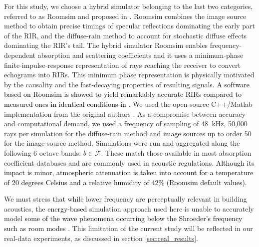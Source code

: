 \documentclass[reprint]{JASA}
\begin{document}
For this study, we choose a hybrid simulator belonging to the last two categories, referred to as Roomsim and proposed in \cite{schimmel2009fast}. Roomsim combines the image source method to obtain precise timings of specular reflections dominating the early part of the RIR, and the diffuse-rain method to account for stochastic diffuse effects dominating the RIR's tail. The hybrid simulator Roomsim enables frequency-dependent absorption and scattering coefficients and it uses a minimum-phase finite-impulse-response representation of rays reaching the receiver to convert echograms into RIRs. This minimum phase representation is physically motivated by the causality and the fast-decaying properties of resulting signals. \textcolor{black}{A software based on Roomsim is showed to yield remarkably accurate RIRs compared to measured ones in identical conditions in \cite{wabnitz2010room}}. We used the open-source C++/Matlab implementation from the original authors \cite{schimmel2009fast}. As a compromise between accuracy and computational demand, we used a frequency of sampling of 48~kHz, 50,000 rays per simulation for the diffuse-rain method and \textcolor{black}{image sources} up to order 50 for the image-source method. Simulations were run and aggregated along the following 6 octave bands: $b \in\mathcal{F}$. These match those available in most absorption coefficient databases and are commonly used in acoustic regulations. \textcolor{black}{Although its impact is minor, atmospheric attenuation is taken into account for a temperature of 20 degrees Celsius and a relative humidity of 42\% (Roomsim default values).}

We must stress that while lower frequency are perceptually relevant in building acoustics, the \textcolor{black}{energy-based} simulation approach used here is unable to accurately model \textcolor{black}{some of the wave phenomena occurring below the Shroeder's frequency \cite{Schroeder:96} such as room modes \cite[Sec. 5.6]{schroder2011physically}.} This limitation of the current study will be reflected in our real-data experiments, as discussed in section \ref{sec:real_results}.
\end{document}
